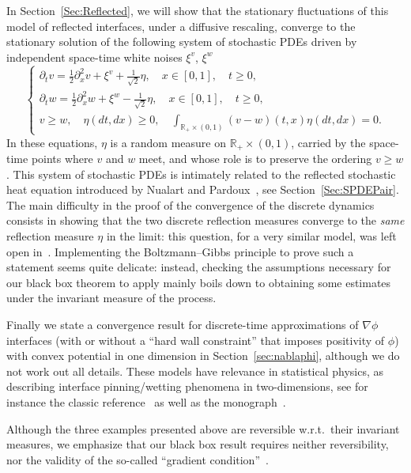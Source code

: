 \documentclass[10pt]{amsart}
\theoremstyle{definition}\newtheorem{defi}[theo]{Definition}\newtheorem{rema}[theo]{Remark}\newtheorem{exam}[theo]{Example}\newtheorem{exem}[theo]{Example}\newtheorem{nota}[theo]{Notation}
\theoremstyle{plain}
\newcommand{\R}{\mathbb{R}}
\begin{document}
In Section~\ref{Sec:Reflected}, we will show that the stationary fluctuations of this model of reflected interfaces, under a diffusive rescaling, converge to the stationary solution of the following system of stochastic PDEs driven by independent space-time white noises $\xi^v$, $\xi^w$
\begin{equation}
\begin{cases}
\partial_t v = \frac12\partial^2_x v + \xi^v + \frac1{\sqrt 2}\eta,\quad x\in [0,1],\quad t\ge 0,\\
\partial_t w = \frac12\partial^2_x w + \xi^w - \frac1{\sqrt 2}\eta,\quad x\in [0,1],\quad t\ge 0,\\
v\ge w,\quad \eta(dt,dx)\ge 0,\quad \int_{\R_+ \times (0,1)} (v-w)(t,x) \eta(dt,dx) = 0.
\end{cases}
\end{equation}
In these equations, $\eta$ is a random measure on $\R_+\times (0,1)$, carried by the space-time points where $v$ and $w$ meet, and whose role is to preserve the ordering $v\geq w$. This system of stochastic PDEs is intimately related to the reflected stochastic heat equation introduced by Nualart and Pardoux~\cite{NualartPardoux92}, see Section~\ref{Sec:SPDEPair}. The main difficulty in the proof of the convergence of the discrete dynamics consists in showing that the two discrete reflection measures converge to the \emph{same} reflection measure $\eta$ in the limit: this question, for a very similar model, was left open in~\cite{EthLab}. Implementing the Boltzmann--Gibbs principle to prove such a statement seems quite delicate: instead, checking the assumptions necessary for our black box theorem to apply mainly boils down to obtaining some estimates under the invariant measure of the process.

Finally we state a convergence result for discrete-time approximations of $\nabla\phi$ interfaces (with or without a ``hard wall constraint'' that imposes positivity of $\phi$) with convex potential in one dimension in Section~\ref{sec:nablaphi}, although we do not work out all details. These models have relevance in statistical physics, as describing interface pinning/wetting phenomena in two-dimensions, see for instance the classic reference~\cite{Fisher} as well as the monograph~\cite{Giacominbook}.

Although the three examples presented above are reversible w.r.t.~their invariant measures, we emphasize that our black box result requires neither reversibility, nor the validity of the so-called ``gradient condition''~\cite{KipLan}.
\end{document}

